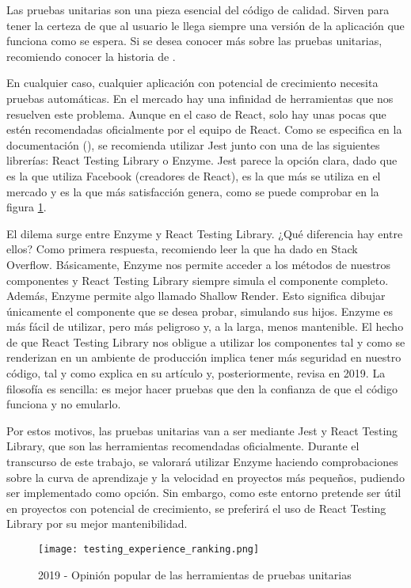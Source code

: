 Las pruebas unitarias son una pieza esencial del código de calidad. Sirven para tener la certeza de que al usuario le llega siempre una versión de la aplicación que funciona como se espera. Si se desea conocer más sobre las pruebas unitarias, recomiendo conocer la historia de \citet{WHYUNT}. 

En cualquier caso, cualquier aplicación con potencial de crecimiento necesita pruebas automáticas. En el mercado hay una infinidad de herramientas que nos resuelven este problema. Aunque en el caso de React, solo hay unas pocas que estén recomendadas oficialmente por el equipo de React. Como se especifica en la documentación (\cite{RETEUT}), se recomienda utilizar Jest junto con una de las siguientes librerías: React Testing Library o Enzyme. Jest parece la opción clara, dado que es la que utiliza Facebook (creadores de React), es la que más se utiliza en el mercado y es la que más satisfacción genera, como se puede comprobar en la figura \cref{fig:stjs2019:unit-testing}.

El dilema surge entre Enzyme y React Testing Library. ¿Qué diferencia hay entre ellos? Como primera respuesta, recomiendo leer la que ha dado \citet{EVRUVRL} en Stack Overflow. Básicamente, Enzyme nos permite acceder a los métodos de nuestros componentes y React Testing Library siempre simula el componente completo. Además, Enzyme permite algo llamado Shallow Render. Esto significa dibujar únicamente el componente que se desea probar, simulando sus hijos. Enzyme es más fácil de utilizar, pero más peligroso y, a la larga, menos mantenible. El hecho de que React Testing Library nos obligue a utilizar los componentes tal y como se renderizan en un ambiente de producción implica tener más seguridad en nuestro código, tal y como explica \citet{NVSHRD} en su artículo y, posteriormente, revisa \citet{RVRT19} en 2019. La filosofía es sencilla: es mejor hacer pruebas que den la confianza de que el código funciona y no emularlo.

Por estos motivos, las pruebas unitarias van a ser mediante Jest y React Testing Library, que son las herramientas recomendadas oficialmente. Durante el transcurso de este trabajo, se valorará utilizar Enzyme haciendo comprobaciones sobre la curva de aprendizaje y la velocidad en proyectos más pequeños, pudiendo ser implementado como opción. Sin embargo, como este entorno pretende ser útil en proyectos con potencial de crecimiento, se preferirá el uso de React Testing Library por su mejor mantenibilidad.

\begin{figure}
	\centering
	\texttt{[image: testing\_experience\_ranking.png]}
	\caption{2019 - Opinión popular de las herramientas de pruebas unitarias}
	\label{fig:stjs2019:unit-testing}
\end{figure}
